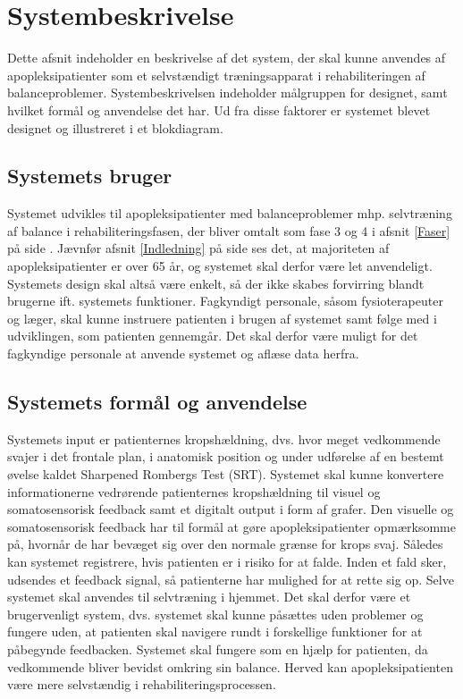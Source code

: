 \section{Systembeskrivelse} 
Dette afsnit indeholder en beskrivelse af det system, der skal kunne anvendes af apopleksipatienter som et selvstændigt træningsapparat i rehabiliteringen af balanceproblemer. Systembeskrivelsen indeholder målgruppen for designet, samt hvilket formål og anvendelse det har. Ud fra disse faktorer er systemet blevet designet og illustreret i et blokdiagram. 

\subsection{Systemets bruger}
Systemet udvikles til apopleksipatienter med balanceproblemer mhp. selvtræning af balance i rehabiliteringsfasen, der bliver omtalt som fase 3 og 4 i afsnit \ref{Faser} på side \pageref{Faser}. Jævnfør afsnit \ref{Indledning} på side \pageref{Indledning} ses det, at majoriteten af apopleksipatienter er over 65 år, og systemet skal derfor være let anvendeligt. Systemets design skal altså være enkelt, så der ikke skabes forvirring blandt brugerne ift. systemets funktioner. Fagkyndigt personale, såsom fysioterapeuter og læger, skal kunne instruere patienten i brugen af systemet samt følge med i udviklingen, som patienten gennemgår. Det skal derfor være muligt for det fagkyndige personale at anvende systemet og aflæse data herfra. 

\subsection{Systemets formål og anvendelse}
Systemets input er patienternes kropshældning, dvs. hvor meget vedkommende svajer i det frontale plan, i anatomisk position og under udførelse af en bestemt øvelse kaldet Sharpened Rombergs Test (SRT). Systemet skal kunne konvertere informationerne vedrørende patienternes kropshældning til visuel og somatosensorisk feedback samt et digitalt output i form af grafer. Den visuelle og somatosensorisk feedback har til formål at gøre apopleksipatienter opmærksomme på, hvornår de har bevæget sig over den normale grænse for krops svaj. Således kan systemet registrere, hvis patienten er i risiko for at falde. Inden et fald sker, udsendes et feedback signal, så patienterne har mulighed for at rette sig op. Selve systemet skal anvendes til selvtræning i hjemmet. Det skal derfor være et brugervenligt system, dvs. systemet skal kunne påsættes uden problemer og fungere uden, at patienten skal navigere rundt i forskellige funktioner for at påbegynde feedbacken. Systemet skal fungere som en hjælp for patienten, da vedkommende bliver bevidst omkring sin balance. Herved kan apopleksipatienten være mere selvstændig i rehabiliteringsprocessen.

